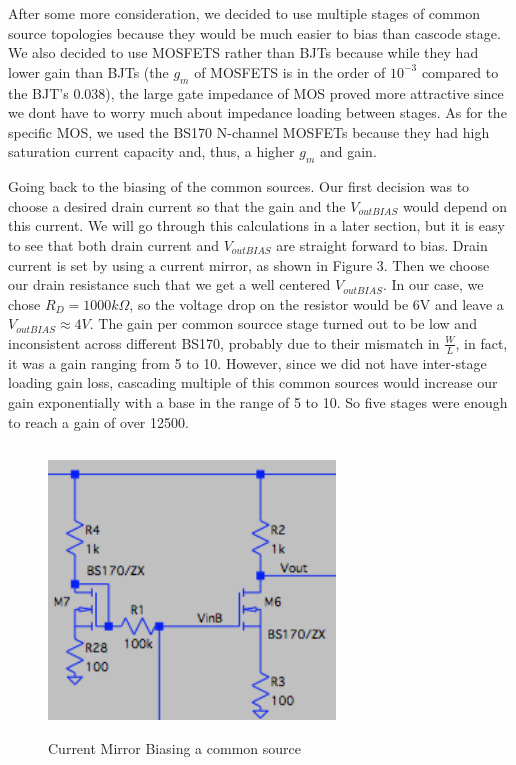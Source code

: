 \documentclass[11pt, twoside, letterpaper]{article}
\begin{document}
After some more consideration, we decided to use multiple stages of common source topologies because they would be much easier to 
bias than cascode stage. We also decided to use MOSFETS rather than BJTs because while they had lower gain than BJTs (the $g_m$ of MOSFETS
is in the order of $10^{-3}$ compared to the BJT's $0.038$), the large gate impedance of MOS proved more attractive since we dont have to
worry much about impedance loading between stages. As for the specific MOS, we used the BS170 N-channel MOSFETs because they had high saturation
current capacity and, thus, a higher $g_m$ and gain.

Going back to the biasing of the common sources. Our first decision was to choose a desired drain current so that the gain and the $V_{outBIAS}$
would depend on this current. We will go through this calculations in a later section, but it is easy to see that both drain current and 
$V_{outBIAS}$ are straight forward to bias. Drain current is set by using a current mirror, as shown in Figure 3. Then we choose our drain 
resistance such that we get a well centered $V_{outBIAS}$. In our case, we chose $R_D=1000k\Omega$, so the voltage drop on the resistor would be 
6V and leave a $V_{outBIAS}\approx 4V$. The gain per common sourcce stage turned out to be low and inconsistent across different BS170, probably
due to their mismatch in $\frac{W}{L}$, in fact, it was a gain ranging from 5 to 10. However, since we did not have inter-stage loading gain loss,
cascading multiple of this common sources would increase our gain exponentially with a base in the range of 5 to 10. So five stages were enough
to reach a gain of over 12500.

\begin{figure}[htbp]
\begin{center}
\includegraphics[width=3in,height=3in]{CurrentMirror.png}
\caption{Current Mirror Biasing a common source}
\end{center}
\end{figure}
\end{document}
